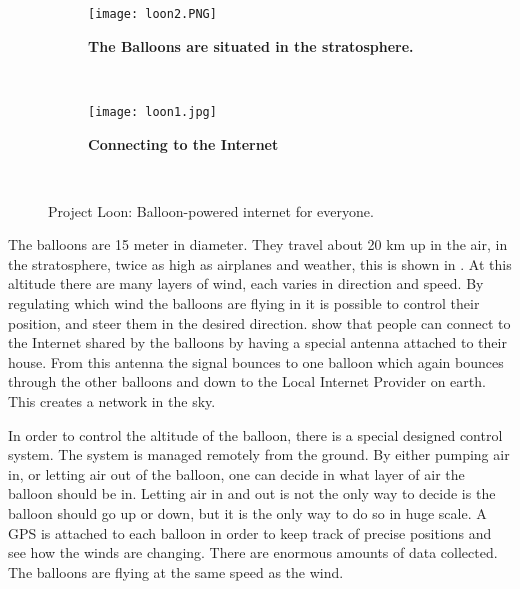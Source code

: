 \begin{figure}
        \centering
        \begin{subfigure}[t]{0.43\textwidth}
                \texttt{[image: loon2.PNG]}
                \caption[The Balloons are situated in the stratosphere]{\textbf{The Balloons are situated in the stratosphere.}} 
                \label{fig:loonStratosphere}
        \end{subfigure}%
        ~ %
        \begin{subfigure}[t]{0.415\textwidth}
                \texttt{[image: loon1.jpg]}
               \caption[Connecting to the Internet]							{\textbf{Connecting to the Internet}} 
                \label{fig:loonConnect}
        \end{subfigure}
        ~ %
        \caption{Project Loon: Balloon-powered internet for everyone.}\label{fig:loon}
\end{figure}

The balloons are 15 meter in diameter. They travel about 20 km up in the air, in the stratosphere, twice as high as airplanes and weather, this is shown in . At this altitude there are many layers of wind, each varies in direction and speed. By regulating which wind the balloons are flying in it is possible to control their position, and steer them in the desired direction.  show that  people can connect to the Internet shared by the balloons by having a special antenna attached to their house. From this antenna the signal bounces to one balloon which again bounces through the other balloons and down to the Local Internet Provider on earth. This creates a network in the sky. 

In order to control the altitude of the balloon, there is a special designed control system. The system is managed remotely from the ground. By either pumping air in, or letting air out of the balloon, one can decide in what layer of air the balloon should be in. Letting air in and out is not the only way to decide is the balloon should go up or down, but it is the only way to do so in huge scale. A GPS is attached to each balloon in order to keep track of precise positions and see how the winds are changing. There are enormous amounts of data collected. The balloons are flying at the same speed as the wind.  


